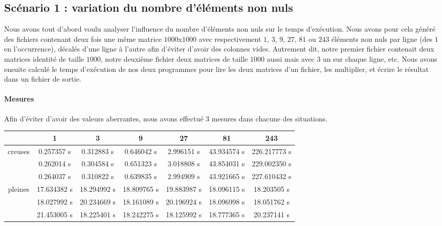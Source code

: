 \documentclass[12pt,a4paper]{article}
\begin{document}
\subsection{Scénario 1 : variation du nombre d'éléments non nuls}

Nous avons tout d'abord voulu analyser l'influence du nombre d'éléments non nuls sur le temps d'exécution. Nous avons pour cela généré des fichiers contenant deux fois une même matrice $1000$x$1000$ avec respectivement $1$, $3$, $9$, $27$, $81$ ou $243$ éléments non nuls par ligne (des $1$ en l'occurrence), décalés d'une ligne à l'autre afin d'éviter d'avoir des colonnes vides. Autrement dit, notre premier fichier contenait deux matrices identité de taille $1000$, notre deuxième fichier deux matrices de taille $1000$ aussi mais avec $3$ un sur chaque ligne, etc. Nous avons ensuite calculé le temps d'exécution de nos deux programmes pour lire les deux matrices d'un fichier, les multiplier, et écrire le résultat dans un fichier de sortie. 

\paragraph{Mesures}
Afin d'éviter d'avoir des valeurs aberrantes, nous avons effectué 3 mesures dans chacune des situations. \\

\begin{tabular}{|*{7}{c|}}
    \hline
       & 1  & 3  & 9  & 27  & 81  & 243 \\
    \hline
    \multirow{3}{*}{creuses}  & 0.257357 s & 0.312883 s & 0.646042 s & 2.996151 s & 43.934574 s & 226.217773 s\\
    & 0.262014 s & 0.304584 s & 0.651323 s & 3.018808 s & 43.854031 s & 229.002350 s\\
    & 0.264037 s & 0.310822 s & 0.639835 s & 2.994909 s & 43.921665 s & 227.610432 s\\
    \hline
     \multirow{3}{*}{pleines} & 17.634382 s & 18.294992 s & 18.809765 s  & 19.883987 s & 18.096115 s & 18.203505 s\\
    & 18.027992 s & 20.234669 s & 18.161089 s & 20.196924 s & 18.096998 s & 18.051762 s\\
    & 21.453005 s & 18.225401 s & 18.242275 s & 18.125992 s & 18.777365 s & 20.237141 s\\
    \hline
\end{tabular}
\end{document}
